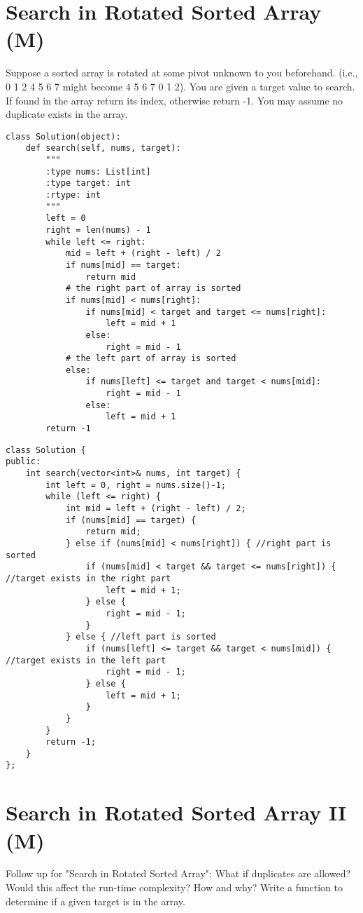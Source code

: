 \section{Search in Rotated Sorted Array (M)}
Suppose a sorted array is rotated at some pivot unknown to you beforehand.
(i.e., 0 1 2 4 5 6 7 might become 4 5 6 7 0 1 2).
You are given a target value to search. If found in the array return its index, otherwise return -1.
You may assume no duplicate exists in the array.\\

\begin{lstlisting}
class Solution(object):
    def search(self, nums, target):
        """
        :type nums: List[int]
        :type target: int
        :rtype: int
        """
        left = 0
        right = len(nums) - 1
        while left <= right:
            mid = left + (right - left) / 2
            if nums[mid] == target:
                return mid
            # the right part of array is sorted
            if nums[mid] < nums[right]:
                if nums[mid] < target and target <= nums[right]:
                    left = mid + 1
                else:
                    right = mid - 1
            # the left part of array is sorted
            else:
                if nums[left] <= target and target < nums[mid]:
                    right = mid - 1
                else: 
                    left = mid + 1
        return -1
\end{lstlisting}

\begin{lstlisting}
class Solution {
public:
    int search(vector<int>& nums, int target) {
        int left = 0, right = nums.size()-1;
        while (left <= right) {
            int mid = left + (right - left) / 2;
            if (nums[mid] == target) {
                return mid;
            } else if (nums[mid] < nums[right]) { //right part is sorted
                if (nums[mid] < target && target <= nums[right]) { //target exists in the right part
                    left = mid + 1;
                } else {
                    right = mid - 1;
                }            
            } else { //left part is sorted
                if (nums[left] <= target && target < nums[mid]) { //target exists in the left part
                    right = mid - 1;
                } else {
                    left = mid + 1;
                }
            }
        }
        return -1;
    }
};
\end{lstlisting}


\section{Search in Rotated Sorted Array II (M)}
Follow up for "Search in Rotated Sorted Array":
What if duplicates are allowed?
Would this affect the run-time complexity? How and why?
Write a function to determine if a given target is in the array.\\

